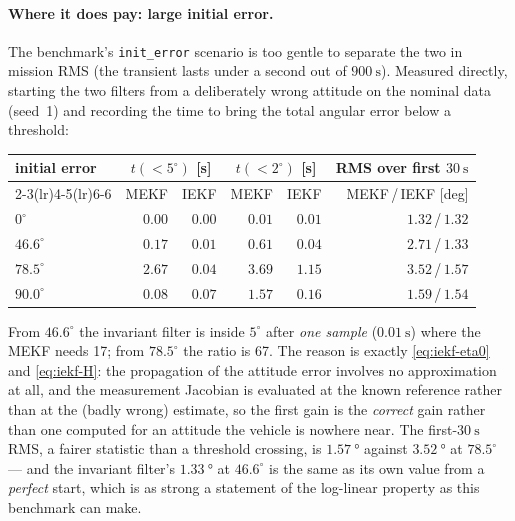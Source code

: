 \paragraph{Where it does pay: large initial error.} The benchmark's \texttt{init\_error} scenario is
too gentle to separate the two in mission RMS (the transient lasts under a second out of
$\SI{900}{\second}$). Measured directly, starting the two filters from a deliberately wrong attitude
on the nominal data (seed~1) and recording the time to bring the total angular error below a
threshold:
\begin{center}
\begin{tabular}{@{}lrrrrr@{}}
\toprule
initial error & \multicolumn{2}{c}{$t(<5^\circ)$ [s]} & \multicolumn{2}{c}{$t(<2^\circ)$ [s]} & RMS over first $\SI{30}{\second}$ \\
\cmidrule(lr){2-3}\cmidrule(lr){4-5}\cmidrule(lr){6-6}
 & MEKF & IEKF & MEKF & IEKF & MEKF\,/\,IEKF [deg] \\
\midrule
$0^\circ$      & $0.00$ & $0.00$ & $0.01$ & $0.01$ & $1.32$\,/\,$1.32$ \\
$46.6^\circ$   & $0.17$ & $\bm{0.01}$ & $0.61$ & $\bm{0.04}$ & $2.71$\,/\,$\bm{1.33}$ \\
$78.5^\circ$   & $2.67$ & $\bm{0.04}$ & $3.69$ & $\bm{1.15}$ & $3.52$\,/\,$\bm{1.57}$ \\
$90.0^\circ$   & $0.08$ & $0.07$ & $1.57$ & $\bm{0.16}$ & $1.59$\,/\,$1.54$ \\
\bottomrule
\end{tabular}
\end{center}
From $46.6^\circ$ the invariant filter is inside $5^\circ$ after \emph{one sample}
($\SI{0.01}{\second}$) where the MEKF needs 17; from $78.5^\circ$ the ratio is 67. The reason is
exactly \eqref{eq:iekf-eta0} and \eqref{eq:iekf-H}: the propagation of the attitude error involves
no approximation at all, and the measurement Jacobian is evaluated at the known reference rather
than at the (badly wrong) estimate, so the first gain is the \emph{correct} gain rather than one
computed for an attitude the vehicle is nowhere near. The first-$\SI{30}{\second}$ RMS, a fairer
statistic than a threshold crossing, is $\SI{1.57}{\degree}$ against $\SI{3.52}{\degree}$ at
$78.5^\circ$ --- and the invariant filter's $\SI{1.33}{\degree}$ at $46.6^\circ$ is the same as its
own value from a \emph{perfect} start, which is as strong a statement of the log-linear property as
this benchmark can make.

